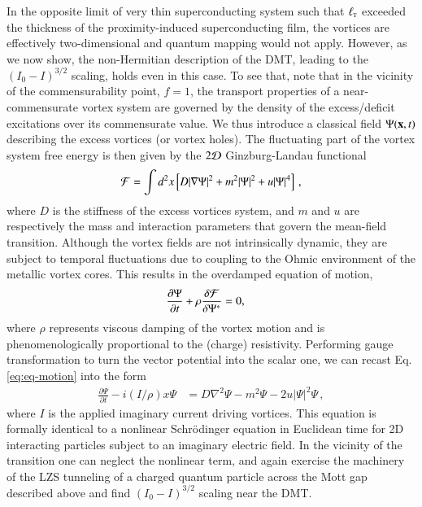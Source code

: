 \documentclass[aps,twocolumn,prl,10pt,amsmath,amssymb,nofootinbib,showpacs,superscriptaddress,floatfix]{revtex4-1}
\newcommand{\rs}{\rm\scriptscriptstyle}
\begin{document}
In the opposite limit of very thin superconducting system such that $\ell_{\rs T}$ exceeded the thickness of the proximity-induced superconducting film, the vortices are effectively two-dimensional and quantum mapping would not apply. However, as we now show, the non-Hermitian description of the DMT, leading to the $(I_0-I)^{3/2}$ scaling, holds even in this case. To see that, note that in the vicinity of the commensurability point, $f=1$, the transport properties of a near-commensurate vortex system are governed by the density of the excess/deficit excitations over its commensurate value. We thus introduce a classical field $\Psi({\bf x},t)$ describing the excess vortices (or vortex holes). The fluctuating part of the vortex system free energy is then given by the $2{\cal D}$ Ginzburg-Landau functional 
\begin{equation}
{\cal F} %
 =\int d^{2}x\left[D|\nabla\Psi|^{2}+m^{2}|\Psi|^{2}+u|\Psi|^{4}\right]\,,\label{eq:LG-model}
\end{equation}
where $D$ is the stiffness of the excess vortices system, and $m$
and $u$ are respectively the mass and interaction parameters that
govern the mean-field transition.
Although the vortex fields are not intrinsically dynamic, they are subject to temporal
fluctuations due to coupling to the Ohmic environment of the metallic vortex cores. 
This results in the overdamped equation of motion,
\begin{align}
\frac{\partial\Psi}{\partial t} & +\rho\frac{\delta {\cal F}}{\delta\Psi^{*}}=0,\label{eq:eq-motion}
\end{align}
where $\rho$ represents viscous damping of the vortex motion and is phenomenologically
proportional to the (charge) resistivity. 
Performing gauge transformation
to turn the vector potential into the scalar one, we can recast
Eq.\,\eqref{eq:eq-motion} into the form
\begin{align}
\frac{\partial\Psi}{\partial t}-i(I/\rho)x\Psi & =D\nabla^{2}\Psi-m^{2}\Psi-2u|\Psi|^{2}\Psi\,,\label{eq:sch-eqn}
\end{align}
where $I$ is the applied imaginary current driving vortices.
This equation is formally identical to a nonlinear Schr\"odinger equation in
Euclidean time for 2D interacting particles subject to an imaginary electric field.
In the vicinity of the transition one can neglect the nonlinear term, and again exercise the machinery of the
LZS tunneling of a charged quantum particle across the Mott gap described above and find $(I_0-I)^{3/2}$ scaling near the DMT.
\end{document}
